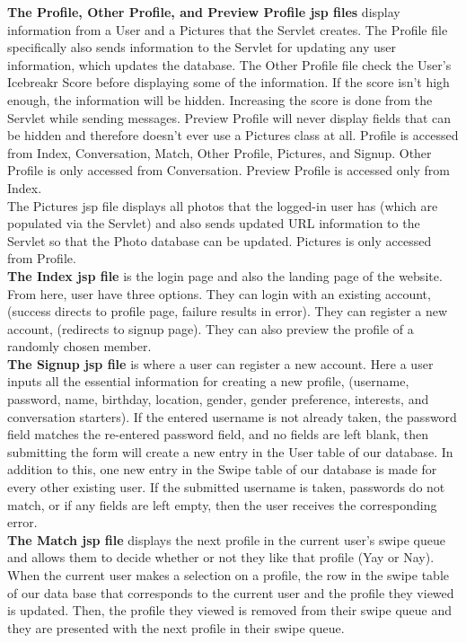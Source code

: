 \documentclass{article}
\begin{document}
\begin{enumerate}
        \textbf{The Profile, Other Profile, and Preview Profile jsp files} display information from a User and a Pictures that the Servlet creates. The Profile file specifically also sends information to the Servlet for updating any user information, which updates the database. The Other Profile file check the User's Icebreakr Score before displaying some of the information. If the score isn't high enough, the information will be hidden. Increasing the score is done from the Servlet while sending messages. Preview Profile will never display fields that can be hidden and therefore doesn't ever use a Pictures class at all. Profile is accessed from Index, Conversation, Match, Other Profile, Pictures, and Signup. Other Profile is only accessed from Conversation. Preview Profile is accessed only from Index.\\
        The Pictures jsp file displays all photos that the logged-in user has (which are populated via the Servlet) and also sends updated URL information to the Servlet so that the Photo database can be updated. Pictures is only accessed from Profile.\\
        \textbf{The Index jsp file} is the login page and also the landing page of the website. From here, user have three options. They can login with an existing account, (success directs to profile page, failure results in error). They can register a new account, (redirects to signup page). They can also preview the profile of a randomly chosen member.\\
        \textbf{The Signup jsp file} is where a user can register a new account. Here a user inputs all the essential information for creating a new profile, (username, password, name, birthday, location, gender, gender preference, interests, and conversation starters). If the entered username is not already taken, the password field matches the re-entered password field, and no fields are left blank, then submitting the form will create a new entry in the User table of our database. In addition to this, one new entry in the Swipe table of our database is made for every other existing user. If the submitted username is taken, passwords do not match, or if any fields are left empty, then the user receives the corresponding error.\\
        \textbf{The Match jsp file} displays the next profile in the current user's swipe queue and allows them to decide whether or not they like that profile (Yay or Nay). When the current user makes a selection on a profile, the row in the swipe table of our data base that corresponds to the current user and the profile they viewed is updated. Then, the profile they viewed is removed from their swipe queue and they are presented with the next profile in their swipe queue.\\

\end{enumerate}
\end{document}
